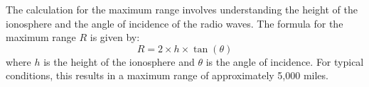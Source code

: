 The calculation for the maximum range involves understanding the height of the ionosphere and the angle of incidence of the radio waves. The formula for the maximum range \( R \) is given by:
\[
R = 2 \times h \times \tan(\theta)
\]
where \( h \) is the height of the ionosphere and \( \theta \) is the angle of incidence. For typical conditions, this results in a maximum range of approximately 5,000 miles.

